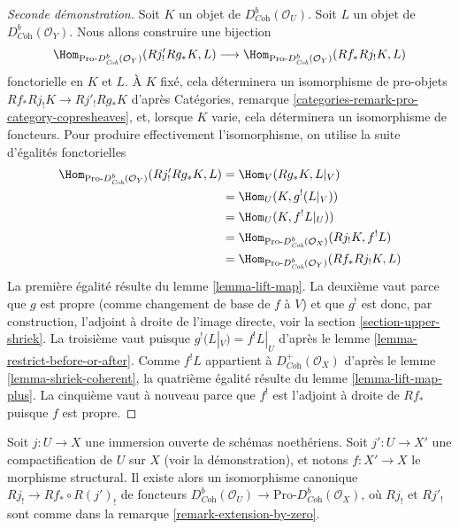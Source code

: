 \begin{proof}[Seconde démonstration]
Soit $K$ un objet de $D^b_{\textit{Coh}}(\mathcal{O}_U)$. Soit $L$ un objet de $D^b_{\textit{Coh}}(\mathcal{O}_Y)$. Nous allons construire une bijection
$$
\Hom_{\text{Pro-}D^b_{\textit{Coh}}(\mathcal{O}_Y)}(Rj'_!Rg_*K, L)
\longrightarrow
\Hom_{\text{Pro-}D^b_{\textit{Coh}}(\mathcal{O}_Y)}(Rf_*Rj_!K, L)
$$
fonctorielle en $K$ et $L$. À $K$ fixé, cela déterminera un isomorphisme de pro-objets
$Rf_*Rj_!K \to Rj'_!Rg_*K$
d'après Catégories, remarque \ref{categories-remark-pro-category-copresheaves}, et, lorsque $K$ varie, cela déterminera un isomorphisme de foncteurs. Pour produire effectivement l'isomorphisme, on utilise la suite d'égalités fonctorielles
\begin{align*}
\Hom_{\text{Pro-}D^b_{\textit{Coh}}(\mathcal{O}_Y)}(Rj'_!Rg_*K, L)
& =
\Hom_V(Rg_*K, L|_V) \\
& =
\Hom_U(K, g^!(L|_V)) \\
& =
\Hom_U(K, f^!L|_U)) \\
& =
\Hom_{\text{Pro-}D^b_{\textit{Coh}}(\mathcal{O}_X)}(Rj_!K, f^!L) \\
& =
\Hom_{\text{Pro-}D^b_{\textit{Coh}}(\mathcal{O}_Y)}(Rf_*Rj_!K, L)
\end{align*}
La première égalité résulte du lemme \ref{lemma-lift-map}. La deuxième vaut parce que $g$ est propre (comme changement de base de $f$ à $V$) et que $g^!$ est donc, par construction, l'adjoint à droite de l'image directe, voir la section \ref{section-upper-shriek}. La troisième vaut puisque $g^!(L|_V) = f^!L|_U$ d'après le lemme \ref{lemma-restrict-before-or-after}. Comme $f^!L$ appartient à $D^+_{\textit{Coh}}(\mathcal{O}_X)$ d'après le lemme \ref{lemma-shriek-coherent}, la quatrième égalité résulte du lemme \ref{lemma-lift-map-plus}. La cinquième vaut à nouveau parce que $f^!$ est l'adjoint à droite de $Rf_*$ puisque $f$ est propre.
\end{proof}

\begin{lemma}
\label{lemma-well-defined}
Soit $j : U \to X$ une immersion ouverte de schémas noethériens. Soit $j' : U \to X'$ une compactification de $U$ sur $X$ (voir la démonstration), et notons $f : X' \to X$ le morphisme structural. Il existe alors un isomorphisme canonique $Rj_! \to Rf_* \circ R(j')_!$ de foncteurs $D^b_{\textit{Coh}}(\mathcal{O}_U) \to
\text{Pro-}D^b_{\textit{Coh}}(\mathcal{O}_X)$, où $Rj_!$ et $Rj'_!$ sont comme dans la remarque \ref{remark-extension-by-zero}.
\end{lemma}


